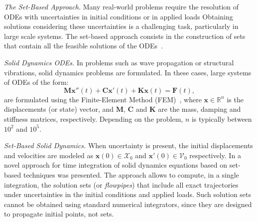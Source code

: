 \documentclass{juliacon}
\begin{document}
	


\maketitle

\emph{The Set-Based Approach.} %
%
Many real-world problems require the resolution of ODEs with uncertainties in initial conditions or in applied loads
%
Obtaining solutions considering these uncertainties is a challenging task, particularly in large scale systems. %
%
The set-based approach consists in the construction of sets that contain all the feasible solutions of the ODEs~\cite{althoff2020set}. %


\vspace{0.2cm}

\emph{Solid Dynamics ODEs.} %
%
In problems such as wave propagation or structural vibrations, solid dynamics problems are formulated. %
%
In these cases, large systems of ODEs of the form:
%
\begin{equation}\label{eq:second_order}
\mathbf{M} \mathbf{x}''(t) + \mathbf{C}\mathbf{x}'(t) + \mathbf{K}\mathbf{x}(t) = \mathbf{F}(t),
\end{equation}
%
are formulated using the Finite-Element Method (FEM)~\cite{Bathe2014}, where $\mathbf{x} \in \mathbb{R}^n$ is the displacements (or state) vector, and $\mathbf{M}$, $\mathbf{C}$ and $\mathbf{K}$ are the mass, damping and stiffness matrices, respectively. Depending on the problem, $n$ is typically  between $10^2$ and $10^5$.

	
\vspace{0.2cm}

\emph{Set-Based Solid Dynamics.} %
%
When uncertainty is present, the initial displacements and velocities are modeled as $\mathbf{x}(0) \in \mathcal{X}_0$ and $\mathbf{x}'(0) \in \mathcal{V}_0$ respectively. %
%
In \cite{forets2021combining} a novel approach for time integration of solid dynamics equations based on set-based techniques was presented. %
%
The approach allows to compute, in a single integration, the solution sets (or \emph{flowpipes}) that include all exact trajectories under uncertainties in the initial conditions and applied loads.
%
Such solution sets cannot be obtained using standard numerical integrators, since they are designed to propagate initial points, not sets.

\vspace{0.2cm}
\end{document}
